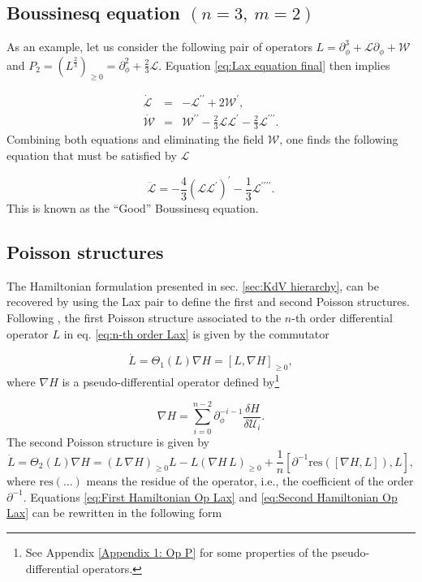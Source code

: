 \documentclass[letterpaper,11pt,oneside]{book}
\begin{document}
\subsection*{Boussinesq equation $\left(n=3,\:m=2\right)$}

As an example, let us consider the following pair of operators $L=\partial_{\phi}^{3}+\mathcal{L}\partial_{\phi}+\mathcal{W}$
and $P_{2}=\left(L^{\frac{2}{3}}\right)_{\geq0}=\partial_{\phi}^{2}+\frac{2}{3}\mathcal{L}$. Equation \eqref{eq:Lax equation final} then implies

\begin{eqnarray*}
\dot{\mathcal{L}} & = & -\mathcal{L}^{\prime\prime}+2\mathcal{W}^{\prime},\\
\dot{\mathcal{W}} & = & \mathcal{W}^{\prime\prime}-\frac{2}{3}\mathcal{L}\mathcal{L}^{\prime}-\frac{2}{3}\mathcal{L}^{\prime\prime\prime}.
\end{eqnarray*}
Combining both equations and eliminating the field $\mathcal{W}$, one finds the following equation that must be satisfied by $\mathcal{L}$

\begin{equation}
	\ddot{\mathcal{L}}=-\frac{4}{3}\left(\mathcal{L}\mathcal{L}^{\prime}\right)^{\prime}-\frac{1}{3}\mathcal{L}^{\prime\prime\prime\prime}.\label{eq:Lax - Boussinesq equation}
\end{equation}
This is known as the ``Good'' Boussinesq equation.

\subsection{Poisson structures}

The Hamiltonian formulation presented in sec. \ref{sec:KdV hierarchy},
can be recovered by using the Lax pair to define the first and second Poisson structures. Following \cite{Blaszak1998}, the first Poisson structure associated to the $n$-th order differential operator $L$ in eq. \eqref{eq:n-th order Lax} is given by the commutator

\begin{equation}
	\dot{L}=\Theta_{1}\left(L\right)\nabla H=\left[L,\nabla H\right]_{\geq0},\label{eq:First Hamiltonian Op Lax}
\end{equation}
where $\nabla H$ is a pseudo-differential operator defined by\footnote{See Appendix \ref{Appendix 1: Op P} for some properties of the pseudo-differential
	operators.}

\[
\nabla H=\sum_{i=0}^{n-2}\partial_{\phi}^{-i-1}\frac{\delta H}{\delta\mathcal{U}_{i}}.
\]
The second Poisson structure is given by
\begin{equation}
	\dot{L}=\Theta_{2}\left(L\right)\nabla H=\left(L\,\nabla H\right)_{\geq0}L-L\left(\nabla H\,L\right)_{\geq0}+\frac{1}{n}\left[\partial^{-1}\text{res}\left(\left[\nabla H,L\right]\right),L\right], \label{eq:Second Hamiltonian Op Lax}
\end{equation}
where $\text{res}\left(\ldots\right)$ means the residue of the operator,
i.e., the coefficient of the order $\partial^{-1}$. Equations \eqref{eq:First Hamiltonian Op Lax} and \eqref{eq:Second Hamiltonian Op Lax} can be rewritten in the following form
\end{document}
